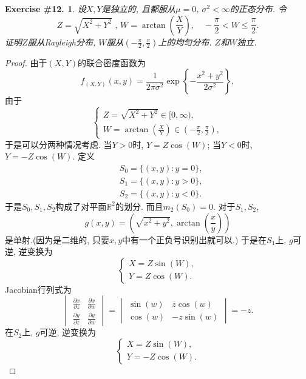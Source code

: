 \documentclass[UTF8, a4paper]{article}
\newtheorem{exercise}{Exercise \#12.}
\begin{document}
\begin{framed}
\begin{exercise}
设\(X,Y\)是独立的, 且都服从\(\mu = 0\), \(\sigma^2 <\infty\)的正态分布. 令
$$
Z=\sqrt{X^2+Y^2} \text { , } W=\operatorname{arctan}\left(\frac{X}{Y}\right), \quad-\frac{\pi}{2}<W \leq \frac{\pi}{2}.
$$
证明\(Z\)服从Rayleigh分布, \(W\)服从\(\left(-\frac{\pi}{2}, \frac{\pi}{2}\right)\)上的均匀分布. \(Z\)和\(W\)独立.
\end{exercise}
\end{framed}

\begin{proof}
由于\((X,Y)\)的联合密度函数为
$$
f_{(X,Y)}(x,y) = \frac{1}{2\pi\sigma^2} \exp\left\{-\frac{x^2+y^2}{2\sigma^2}\right\},
$$
由于
$$
\begin{cases}
Z = \sqrt{X^2+Y^2} \in [0, \infty), \\
W = \arctan\left(\frac{X}{Y}\right) \in \left(-\frac{\pi}{2}, \frac{\pi}{2}\right),
\end{cases}
$$
于是可以分两种情况考虑. 当\(Y > 0\)时, \(Y = Z \cos(W)\); 当\(Y < 0\)时, \(Y = -Z \cos(W)\).
定义
$$
\begin{aligned}
    & S_0 = \{(x,y): y = 0\}, \\
    & S_1 = \{(x,y): y > 0\}, \\
    & S_2 = \{(x,y): y < 0\}.
\end{aligned}
$$
于是\(S_0, S_1, S_2\)构成了对平面\(\mathbb{R}^2\)的划分. 而且\(m_2(S_0) = 0\).
对于\(S_1, S_2\), 
$$
g(x,y) = \left(\sqrt{x^2 + y^2}, \arctan\left(\frac{x}{y}\right)\right)
$$
是单射.(因为是二维的, 只要\(x,y\)中有一个正负号识别出就可以.)
于是在\(S_1\)上, \(g\)可逆, 逆变换为
$$
\begin{cases}
X = Z\sin(W), \\
Y = Z\cos(W).
\end{cases}
$$
Jacobian行列式为
$$
\begin{vmatrix}
\frac{\partial x}{\partial z} & \frac{\partial x}{\partial w} \\
\frac{\partial y}{\partial z} & \frac{\partial y}{\partial w}
\end{vmatrix} = \begin{vmatrix}
    \sin(w) & z\cos(w) \\
    \cos(w) & -z\sin(w)
    \end{vmatrix}  = -z.
$$
在\(S_2\)上, \(g\)可逆, 逆变换为
$$
\begin{cases}
X = Z\sin(W), \\
Y = -Z\cos(W).
\end{cases}
$$
\end{proof}
\end{document}

